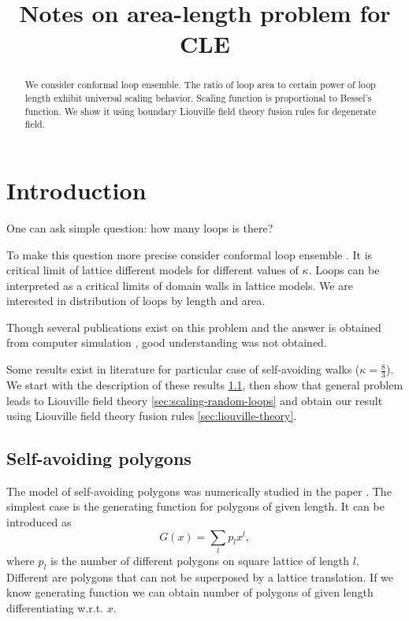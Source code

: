 \documentclass[12pt]{article}
\begin{document}
\title{Notes on area-length problem for CLE}

\maketitle

\begin{abstract}

  We consider conformal loop ensemble. The ratio
  of loop area to certain power of loop length exhibit universal
  scaling behavior. Scaling function is proportional to Bessel's
  function. We show it using boundary Liouville field theory fusion rules for degenerate field.
\end{abstract}

\section{Introduction}
\label{sec:introduction}


One can ask simple question: how many loops is there?

To make this question more precise consider conformal loop ensemble \cite{sheffield2010conformal}. It is critical limit of
lattice different models for different values of $\kappa$. Loops can be interpreted as a critical
limits of domain walls in lattice models. 
We are interested in distribution of loops by length and area. 

Though several publications exist
\cite{cardy2003exact,cardy2003crossover,cardy2001exact,cardy1994geometrical}
on this problem and the answer is
obtained from computer simulation \cite{ richard2001scaling}, good understanding was not
obtained. 


Some results exist in literature for particular case of self-avoiding walks ($\kappa=\frac{8}{3}$). We start
with the description of these results \ref{sec:self-avoid-polyg}, then show that general problem
leads to Liouville field theory \ref{sec:scaling-random-loops} and obtain our result using Liouville
field theory fusion rules \ref{sec:liouville-theory}. 




\subsection{Self-avoiding polygons}
\label{sec:self-avoid-polyg}

The model of self-avoiding polygons was numerically studied in the paper \cite{richard2001scaling}.
The simplest case is the generating function for polygons of given length. It can be introduced as
\begin{equation}
  \label{eq:86}
  G(x)=\sum_l p_l x^l,
\end{equation}
where  $p_l$ is the number of different polygons on square lattice of length $l$. Different are
polygons that can not be superposed by a lattice translation.
If we know generating function we can obtain number of polygons of given length differentiating
w.r.t. $x$. 
\end{document}

